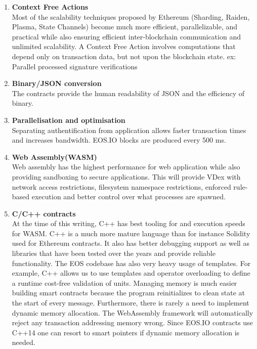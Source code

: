 \documentclass[]{article}
\begin{document}
	\begin{enumerate}
					
			\item \textbf{Context Free Actions} \\
		Most of the scalability techniques proposed by Ethereum (Sharding, Raiden, Plasma, State Channels) become much more efficient, parallelizable, and practical while also ensuring efficient inter-blockchain communication and unlimited scalability.
		A Context Free Action involves computations that depend only on transaction data, but not upon the blockchain state.
		ex: Parallel processed signature verifications\\
		
		\item\textbf{ Binary/JSON conversion} \\
		 The contracts provide the human readability of JSON and the efficiency of binary. \\
	
		\item \textbf{Parallelisation and optimisation\\ } 
		Separating authentification from application allows faster transaction times and increases bandwidth.
		EOS.IO blocks are produced every 500 ms.
		
	\item \textbf{Web Assembly(WASM)}   \\
	Web assembly has the highest performance for web application while also providing sandboxing to secure applications.
	This will provide VDex with network access restrictions,
	filesystem namespace restrictions, enforced rule-based execution and better control over what processes are spawned.
	
	\item \textbf{C/C++ contracts\\}
	At the time of this writing,
	C++ has best tooling for and execution speeds for WASM.
	C++ is a much more mature language than for instance Solidity used for Ethereum contracts.
	It also has better debugging support as well as libraries that have been tested over the years and provide reliable functionality. 
	The EOS codebase has also very heavy usage of templates.
	For example, C++ allows us to use templates and operator overloading to define a runtime cost-free validation of units.
	Managing memory is much easier building smart contracts because the
	program reinitializes to clean state at the start of every message. Furthermore, there is rarely a need to implement dynamic memory allocation. The WebAssembly framework will automatically reject any transaction addressing memory wrong.
	Since EOS.IO contracts use C++14 one can resort to smart pointers if dynamic memory allocation is needed.
	 	

\end{enumerate}
\end{document}
